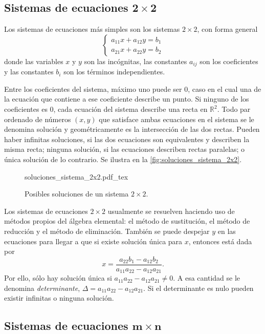 \documentclass{fmbnotes}
\begin{document}
\subsection[Sistemas de ecuaciones \(2 \times 2\)]{Sistemas de ecuaciones \(\bm{2 \times 2}\)}
Los sistemas de ecuaciones más simples son los sistemas \(2 \times 2\), con forma general
\[\begin{cases}
a_{11}x+a_{12}y=b_1 \\ a_{21}x+a_{22}y=b_2
\end{cases}
\label{eq:sistema_2x2}\]
donde las variables \(x\) y \(y\) son las incógnitas, las constantes \(a_{ij}\) son los coeficientes y las constantes \(b_i\) son los términos independientes. 

Entre los coeficientes del sistema, máximo uno puede ser 0, caso en el cual una de la ecuación que contiene a ese coeficiente describe un punto. Si ninguno de los coeficientes es 0, cada ecuación del sistema describe una recta en \(\mathbb{R}^{2}\). Todo par ordenado de números \( (x, y) \) que satisface ambas ecuaciones en el sistema se le denomina solución y geométricamente es la intersección de las dos rectas. Pueden haber infinitas soluciones, si las dos ecuaciones son equivalentes y describen la misma recta; ninguna solución, si las ecuaciones describen rectas paralelas; o única solución de lo contrario. Se ilustra en la \autoref{fig:soluciones_sistema_2x2}.

\begin{figure}[h]
\centering
{soluciones_sistema_2x2.pdf_tex}
\caption{Posibles soluciones de un sistema \(2\times 2\).}
\label{fig:soluciones_sistema_2x2}
\end{figure}

Los sistemas de ecuaciones \(2 \times 2\) usualmente se resuelven haciendo uso de métodos propios del álgebra elemental: el método de sustitución, el método de reducción y el método de eliminación. También se puede despejar \( y \) en las ecuaciones para llegar a que si existe solución única para \(x\), entonces está dada por
\[x=\frac{a_{22}b_1-a_{12}b_2}{a_{11}a_{22}-a_{12}a_{21}}.\]
Por ello, sólo hay solución única si \(a_{11}a_{22}-a_{12}a_{21} \neq 0\). A esa cantidad se le denomina \emph{determinante},  \(\Delta=a_{11}a_{22}-a_{12}a_{21}\). Si el determinante es nulo pueden existir infinitas o ninguna solución.

\subsection[Sistemas de ecuaciones \(m \times n\)]{Sistemas de ecuaciones \(\bm{m \times n}\)}
\end{document}
